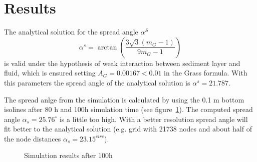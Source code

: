 %
\section{Results}
%
The analytical solution for the spread angle $\alpha^S$
\begin{equation}
\alpha^s = \arctan (\frac{3\sqrt{3}(m_G-1)}{9m_G-1})
\end{equation}
is valid under the hypothesis of weak interaction between sediment layer
and fluid, which is ensured setting $A_G=0.00167 < 0.01$ in the Grass formula.
With this parameters the spread angle of the analytical solution is $\alpha^s=21.787$.

The spread anlge from the simulation is calculated by using the
0.1 m  bottom isolines after 80 h and 100h simulation time (see figure~\ref{sis_bump-t2d}).
The computed spread angle $\alpha_s=25.76^{\circ}$ is a little too high. With a better resolution
spread angle will fit better to the analytical solution
(e.g. grid with 21738 nodes and about half of the node distances $\alpha_s=23.15^{circ}$).


\begin{figure} [!ht]
\centering
{}
\caption{Simulation results after 100h}
\label{sis_bump-t2d}
\end{figure}


